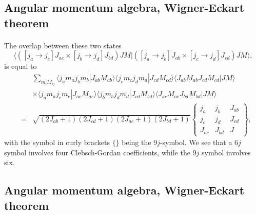 \documentclass[%
twoside,                 %
final,                   %
10pt]{article}
\begin{document}
\subsection*{Angular momentum algebra, Wigner-Eckart theorem}

\paragraph{}
The overlap between these two states
\[
\langle([j_a\rightarrow j_c]J_{ac}\times [j_b\rightarrow j_d]J_{bd}) JM| ([j_a\rightarrow j_b]J_{ab}\times [j_c\rightarrow j_d]J_{cd}) JM\rangle, 
\]
is equal to 
\begin{eqnarray}
\nonumber
& & \sum_{m_iM_{ij}}\langle j_am_aj_bm_b|J_{ab}M_{ab}\rangle \langle j_cm_cj_dm_d|J_{cd}M_{cd}\rangle \langle J_{ab}M_{ab}J_{cd}M_{cd}|JM\rangle \\
& & \times\langle j_am_aj_cm_c|J_{ac}M_{ac}\rangle \langle j_bm_bj_dm_d|J_{cd}M_{bd}\rangle \langle J_{ac}M_{ac}J_{bd}M_{bd}|JM\rangle \\  \nonumber
&= & \sqrt{(2J_{ab}+1)(2J_{cd}+1)(2J_{ac}+1)(2J_{bd}+1)}\left\{\begin{array}{ccc} j_a & j_b& J_{ab} \\ j_c & j_d& J_{cd} \\J_{ac} & J_{bd}& J\end{array}\right\}
, \nonumber
\end{eqnarray}
with the symbol in curly brackets $\{\}$ being the $9j$-symbol. We see  that a $6j$ symbol  involves four Clebsch-Gordan coefficients, while the $9j$ symbol
involves six.



\subsection*{Angular momentum algebra, Wigner-Eckart theorem}

\end{document}
